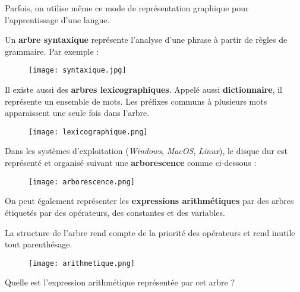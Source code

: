 \documentclass[french]{article}
\theoremstyle{plain}
\begin{document}
Parfois, on utilise même ce mode de représentation graphique pour l'apprentissage d'une langue.

Un \textbf{arbre syntaxique} représente l'analyse d'une phrase à partir de règles de grammaire. Par exemple : 

	\begin{figure}[h]  %
	\centering
	\texttt{[image: syntaxique.jpg]}
	\end{figure}
	
	Il existe aussi des \textbf{arbres lexicographiques}. Appelé aussi \textbf{dictionnaire}, il représente un ensemble de mots. Les préfixes communs à plusieurs mots apparaissent une seule fois dans l'arbre.
	
		\begin{figure}[h]  %
		\centering
		\texttt{[image: lexicographique.png]}
		\end{figure}


Dans les systèmes d'exploitation (\textit{Windows}, \textit{MacOS}, \textit{Linux}), le disque dur est représenté et organisé suivant une \textbf{arborescence} comme ci-dessous :


	\begin{figure}[h]  %
	\centering
	\texttt{[image: arborescence.png]}
	\end{figure}

\newpage

On peut également représenter les \textbf{expressions arithmétiques} par des arbres étiquetés par des opérateurs, des constantes et des variables.

La structure de l'arbre rend compte de la priorité des opérateurs et rend inutile tout parenthésage.

	\begin{figure}[h]  %
	\centering
	\texttt{[image: arithmetique.png]}
\end{figure}

Quelle est l'expression arithmétique représentée par cet arbre ?

\begin{tcolorbox}[colback=blue!5!white,colframe=blue!75!black,title=Réponse :]
	
\vspace*{1cm}
	
\end{tcolorbox}
\end{document}
